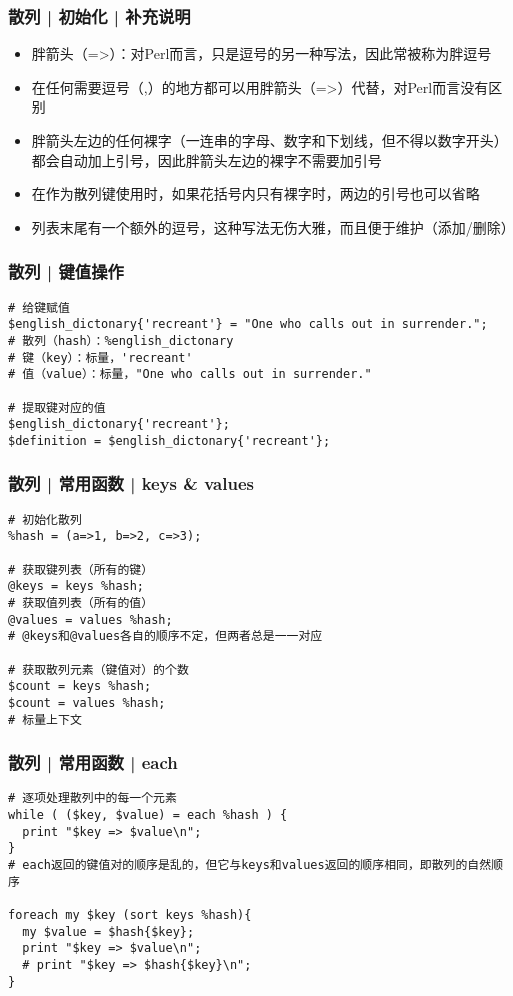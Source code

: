 \begin{frame}
  \frametitle{散列 | 初始化 | \alert{补充说明}}
  \begin{itemize}
    \item 胖箭头（=>）：对Perl而言，只是逗号的另一种写法，因此常被称为胖逗号
    \item 在任何需要逗号（,）的地方都可以用胖箭头（=>）代替，对Perl而言没有区别
    \item 胖箭头左边的任何裸字（一连串的字母、数字和下划线，但不得以数字开头）都会自动加上引号，因此胖箭头左边的裸字不需要加引号
    \item 在作为散列键使用时，如果花括号内只有裸字时，两边的引号也可以省略
    \item 列表末尾有一个额外的逗号，这种写法无伤大雅，而且便于维护（添加/删除）
  \end{itemize}
\end{frame}

\begin{frame}[fragile]
  \frametitle{散列 | \alert{键值操作}}
\begin{lstlisting}
# 给键赋值
$english_dictonary{'recreant'} = "One who calls out in surrender.";
# 散列（hash）：%english_dictonary
# 键（key）：标量，'recreant'
# 值（value）：标量，"One who calls out in surrender."

# 提取键对应的值
$english_dictonary{'recreant'};
$definition = $english_dictonary{'recreant'};
\end{lstlisting}
\end{frame}

\begin{frame}[fragile]
  \frametitle{散列 | \alert{常用函数} | keys \& values}
\begin{lstlisting}
# 初始化散列
%hash = (a=>1, b=>2, c=>3);

# 获取键列表（所有的键）
@keys = keys %hash;
# 获取值列表（所有的值）
@values = values %hash;
# @keys和@values各自的顺序不定，但两者总是一一对应

# 获取散列元素（键值对）的个数
$count = keys %hash;
$count = values %hash;
# 标量上下文
\end{lstlisting}
\end{frame}

\begin{frame}[fragile]
  \frametitle{散列 | \alert{常用函数} | each}
\begin{lstlisting}
# 逐项处理散列中的每一个元素
while ( ($key, $value) = each %hash ) {
  print "$key => $value\n";
}
# each返回的键值对的顺序是乱的，但它与keys和values返回的顺序相同，即散列的自然顺序

foreach my $key (sort keys %hash){
  my $value = $hash{$key};
  print "$key => $value\n";
  # print "$key => $hash{$key}\n";
}
\end{lstlisting}
\end{frame}

